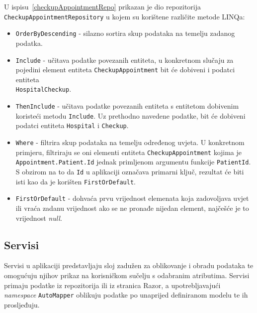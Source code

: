U ispisu~\ref{checkupAppointmentRepo} prikazan je dio repozitorija \texttt{CheckupAppointmentRepository} u kojem su korištene različite metode LINQa:

\begin{itemize}
\item \texttt{OrderByDescending} - silazno sortira skup podataka na temelju zadanog podatka.

\item \texttt{Include} - učitava podatke povezanih entiteta, u konkretnom slučaju za pojedini element entiteta \texttt{CheckupAppointment} bit će dobiveni i podatci entiteta \\\texttt{HospitalCheckup}.

\item \texttt{ThenInclude} - učitava podatke povezanih entiteta s entitetom dobivenim koristeći metodu \texttt{Include}. Uz prethodno navedene podatke, bit će dobiveni podatci entiteta \texttt{Hospital} i \texttt{Checkup}.

\item \texttt{Where} - filtrira skup podataka na temelju određenog uvjeta. U konkretnom primjeru, filtriraju se oni elementi entiteta \texttt{CheckupAppointment} kojima je \\\texttt{Appointment.Patient.Id} jednak primljenom argumentu funkcije \texttt{PatientId}. S obzirom na to da \texttt{Id} u aplikaciji označava primarni ključ, rezultat će biti isti kao da je korišten \texttt{FirstOrDefault}.

\item \texttt{FirstOrDefault} - dohvaća prvu vrijednost elemenata koja zadovoljava uvjet ili vraća zadanu vrijednost ako se ne pronađe nijedan element, najčešće je to vrijednost \textit{null}.
\end{itemize}

\subsection{Servisi}

Servisi u aplikaciji predstavljaju sloj zadužen za oblikovanje i obradu podataka te omogućuju njihov prikaz na korisničkom sučelju s odabranim atributima. Servisi primaju podatke iz repozitorija ili iz stranica Razor, a upotrebljavajući \textit{namespace} \texttt{AutoMapper} oblikuju podatke po unaprijed definiranom modelu te ih prosljeđuju. 

